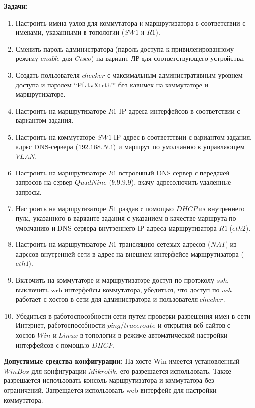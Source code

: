 {\bfseries Задачи:}
\begin{enumerate}
    \item Настроить имена узлов для коммутатора и маршрутизатора в соответствии с именами, указанными в топологии ($SW1$ и $R1$).
    \item Сменить пароль администратора (пароль доступа к привилегированному режиму $enable$ для $Cisco$) на вариант ЛР для соответствующего устройства.
    \item Создать пользователя $checker$ с максимальным административным уровнем доступа и паролем “PfxtvXtrth!” без кавычек на коммутаторе и маршрутизаторе.
    \item Настроить на маршрутизаторе $R1$ IP-адреса интерфейсов в соответствии с вариантом задания.
    \item Настроить на коммутаторе $SW1$ IP-адрес в соответствии с вариантом задания, адрес DNS-сервера ($192.168.N.1$) и маршрут по умолчанию в управляющем $VLAN$.
    \item Настроить на маршрутизаторе $R1$ встроенный DNS-сервер с передачей запросов на сервер $QuadNine$ ($9.9.9.9$), вкачу адресолючить удаленные запросы.
    \item Настроить на маршрутизаторе $R1$ раздав с помощью $DHCP$ из внутреннего пула, указанного в варианте задания с указанием в качестве маршрута по умолчанию и DNS-сервера внутреннего IP-адреса маршрутизатора $R1$ ($eth2$).
    \item Настроить на маршрутизаторе $R1$ трансляцию сетевых адресов ($NAT$) из адресов внутренней сети в адрес на внешнем интерфейсе маршрутизатора ($eth1$).
    \item Включить на коммутаторе и маршрутизаторе доступ по протоколу $ssh$, выключить web-интерфейсы коммутатора, убедиться, что доступ по $ssh$ работает с хостов в сети для администратора и пользователя $checker$.
    \item Убедиться в работоспособности сети путем проверки разрешения имен в сети Интернет, работоспособности $ping/traceroute$ и открытия веб-сайтов с хостов $Win$ и $Linux$ в топологии в режиме автоматической настройки интерфейсов с помощью $DHCP$.  
\end{enumerate}

{\bfseries Допустимые средства конфигурации:} На хосте Win имеется установленный $WinBox$ для конфигурации $Mikrotik$, его разрешается использовать. Также разрешается использовать консоль маршрутизатора и коммутатора без ограничений. Запрещается использовать web-интерфейс для настройки коммутатора.

\pagebreak